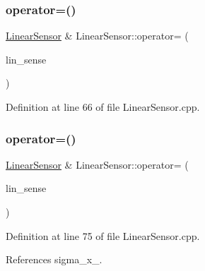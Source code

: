 \mbox{\label{classbfl_1_1LinearSensor_a83054bf80986f7b1772e71fdb8b37040}} 
\subsubsection{\texorpdfstring{operator=()}{operator=()}\hspace{0.1cm}{\footnotesize\ttfamily [1/2]}}
{\footnotesize\ttfamily \mbox{\hyperlink{classbfl_1_1LinearSensor}{Linear\+Sensor}} \& Linear\+Sensor\+::operator= (\begin{DoxyParamCaption}\item[{const \mbox{\hyperlink{classbfl_1_1LinearSensor}{Linear\+Sensor}} \&}]{lin\+\_\+sense }\end{DoxyParamCaption})\hspace{0.3cm}{\ttfamily [noexcept]}}



Definition at line 66 of file Linear\+Sensor.\+cpp.

\mbox{\label{classbfl_1_1LinearSensor_aa93327ef56a19a9712f736d12fbf2651}} 
\subsubsection{\texorpdfstring{operator=()}{operator=()}\hspace{0.1cm}{\footnotesize\ttfamily [2/2]}}
{\footnotesize\ttfamily \mbox{\hyperlink{classbfl_1_1LinearSensor}{Linear\+Sensor}} \& Linear\+Sensor\+::operator= (\begin{DoxyParamCaption}\item[{\mbox{\hyperlink{classbfl_1_1LinearSensor}{Linear\+Sensor}} \&\&}]{lin\+\_\+sense }\end{DoxyParamCaption})\hspace{0.3cm}{\ttfamily [noexcept]}}



Definition at line 75 of file Linear\+Sensor.\+cpp.



References sigma\+\_\+x\+\_\+.

\mbox{\label{classbfl_1_1LinearSensor_a3d20baf95d4ea62c536c87e68238852f}} 
